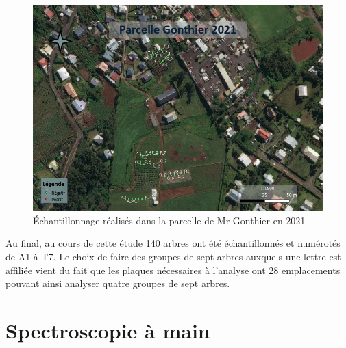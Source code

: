 \documentclass[
  11pt,
  french,
  a4paper,
  extrafontsizes,onecolumn,openright
  ]{memoir}
\begin{document}
\begin{figure}

{\centering \includegraphics[width=0.8\linewidth]{Images/Figure6} 

}

\caption{Échantillonnage réalisés dans la parcelle de Mr Gonthier en 2021}\label{fig:6}
\end{figure}

\normalsize

Au final, au cours de cette étude 140 arbres ont été échantillonnés et numérotés de A1 à T7. Le choix de faire des groupes de sept arbres auxquels une lettre est affiliée vient du fait que les plaques nécessaires à l'analyse ont 28 emplacements pouvant ainsi analyser quatre groupes de sept arbres.

\vfill
\newpage

\hypertarget{spectroscopie-uxe0-main}{%
\section{Spectroscopie à main}\label{spectroscopie-uxe0-main}}
\end{document}
